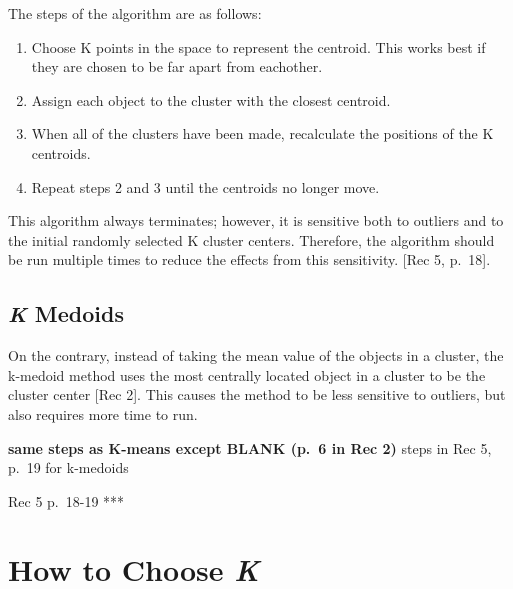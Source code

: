 \documentclass[12pt,twoside]{amherstthesis}
\providecommand{\tightlist}{%
  \setlength{\itemsep}{0pt}\setlength{\parskip}{0pt}}
\begin{document}
  The steps of the algorithm are as follows:
  
  \begin{enumerate}
  \def\labelenumi{\arabic{enumi}.}
  \tightlist
  \item
    Choose K points in the space to represent the centroid. This works
    best if they are chosen to be far apart from eachother.
  \item
    Assign each object to the cluster with the closest centroid.
  \item
    When all of the clusters have been made, recalculate the positions of
    the K centroids.
  \item
    Repeat steps 2 and 3 until the centroids no longer move.
  \end{enumerate}
  
  This algorithm always terminates; however, it is sensitive both to
  outliers and to the initial randomly selected K cluster centers.
  Therefore, the algorithm should be run multiple times to reduce the
  effects from this sensitivity. {[}Rec 5, p.~18{]}.
  
  \subsection{\texorpdfstring{\emph{K}
  Medoids}{K Medoids}}\label{k-medoids}
  
  On the contrary, instead of taking the mean value of the objects in a
  cluster, the k-medoid method uses the most centrally located object in a
  cluster to be the cluster center {[}Rec 2{]}. This causes the method to
  be less sensitive to outliers, but also requires more time to run.
  
  \textbf{same steps as K-means except BLANK (p.~6 in Rec 2) }steps in Rec
  5, p.~19 for k-medoids
  
  Rec 5 p.~18-19 ***
  
  \begin{Shaded}
  \begin{Highlighting}[]
  \end{Highlighting}
  \end{Shaded}
  
  \section{\texorpdfstring{How to Choose
  \emph{K}}{How to Choose K}}\label{how-to-choose-k}
  
\end{document}
